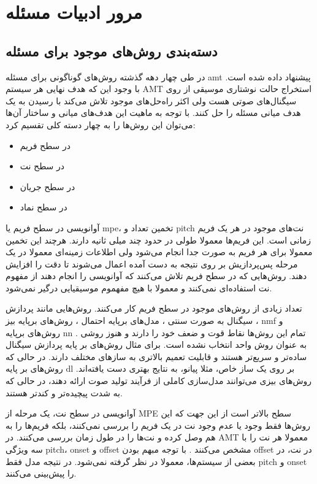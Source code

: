 \chapter{مرور ادبیات مسئله}
\section{دسته‌بندی روش‌های موجود برای مسئله}
در طی چهار دهه گذشته روش‌های گوناگونی برای مسئله \gls{amt} پیشنهاد داده شده است.
با وجود این که هدف نهایی هر سیستم \gls{AMT} استخراج حالت نوشتاری موسیقی از روی
سیگنال‌های صوتی هست ولی اکثر راه‌حل‌های موجود تلاش می‌کند با رسیدن به یک هدف
میانی مسئله را حل کنند. با توجه به ماهیت این هدف‌های میانی و ساختار آن‌ها
می‌توان این روش‌ها را به چهار دسته کلی تقسیم کرد:
\begin{itemize}
    \item در سطح فریم
    \item در سطح نت
    \item در سطح جریان
    \item در سطح نماد
\end{itemize}

آوانویسی در سطح فریم یا \gls{mpe}، تخمین تعداد و \gls{pitch} نت‌های موجود در هر
یک فریم زمانی است. این فریم‌ها معمولا طولی در حدود چند میلی ثانیه دارند. هرچند این
تخمین معمولا برای هر فریم به صورت جدا انجام می‌شود ولی اطلاعات زمینه‌ای معمولا در
یک مرحله‌ پس‌پردازیش بر روی نتیجه به دست آمده اعمال می‌شوند تا دقت را افزایش
دهند. روش‌هایی که در سطح فریم تلاش می‌کنند که آوانویسی را انجام دهند از مفهوم نت
استفاده‌ای نمی‌کنند و معمولا با هیچ مفهموم موسیقیایی درگیر نمی‌شود.

تعداد زیادی از روش‌های موجود در سطح فریم کار می‌کنند. روش‌هایی مانند پردازش
سیگنال به صورت سنتی \cite{emiya2009multipitch,su2015combining}، مدل‌های برپایه
احتمال \cite{duan2010multiple}، روش‌های برپایه بیز \cite{peeling2009generative}،
\gls{nmf}
\cite{smaragdis2003non,vincent2009adaptive,benetos2013automatic,fuentes2013harmonic}
و روش‌های برپایه \gls{nn} \cite{sigtia2016end,kelz2016potential}. تمام این
روش‌ها نقاط قوت و ضعف خود را دارند و هنوز روشی به عنوان روش واحد انتخاب نشده
است. برای مثال روش‌های بر پایه پردازش سیگنال ساده‌تر و سریع‌تر هستند و قابلیت
تعمیم بالاتری به سازهای مختلف دارند. در حالی که روش‌های بر پایه \gls{dl} بر روی
یک ساز خاص، مثلا پیانو، به نتایج بهتری دست یافته‌اند. روش‌های بیزی می‌توانند
مدل‌سازی کاملی از فرآیند تولید صوت ارائه دهند، در حالی که به شدت پیچیده‌تر و
کندتر هستند.

آوانویسی در سطح نت، یک مرحله از \gls{MPE} سطح بالاتر است از این جهت که این
روش‌ها فقط وجود یا عدم وجود نت در یک فریم را بررسی نمی‌کنند، بلکه فریم‌ها را به
هم وصل کرده و نت‌ها را در طول زمان بررسی می‌کنند. در \gls{AMT} معمولا هر نت را
با سه ویژگی \gls{pitch}، onset و offset مشخص می‌کنند \cite{klapuri2007signal}.
با توجه مبهم بودن offset در نت، در بعضی از سیستم‌ها، معمولا در نظر گرفته
نمی‌شود. در نتیجه مدل فقط \gls{pitch} و onset را پیش‌بینی می‌کنند.

